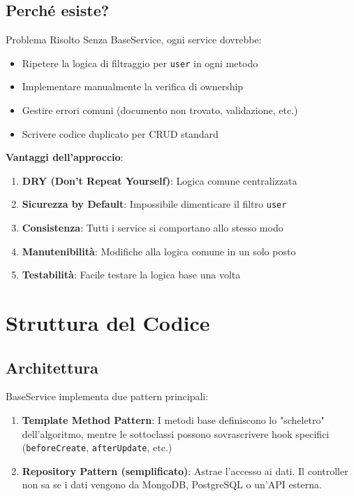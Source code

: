 \documentclass[11pt,a4paper]{article}
\begin{document}
\subsection{Perché esiste?}

\begin{importantbox}{Problema Risolto}
Senza BaseService, ogni service dovrebbe:
\begin{itemize}
    \item Ripetere la logica di filtraggio per \texttt{user} in ogni metodo
    \item Implementare manualmente la verifica di ownership
    \item Gestire errori comuni (documento non trovato, validazione, etc.)
    \item Scrivere codice duplicato per CRUD standard
\end{itemize}
\end{importantbox}

\textbf{Vantaggi dell'approccio}:
\begin{enumerate}
    \item \textbf{DRY (Don't Repeat Yourself)}: Logica comune centralizzata
    \item \textbf{Sicurezza by Default}: Impossibile dimenticare il filtro \texttt{user}
    \item \textbf{Consistenza}: Tutti i service si comportano allo stesso modo
    \item \textbf{Manutenibilità}: Modifiche alla logica comune in un solo posto
    \item \textbf{Testabilità}: Facile testare la logica base una volta
\end{enumerate}

\section{Struttura del Codice}

\subsection{Architettura}

BaseService implementa due pattern principali:

\begin{enumerate}
    \item \textbf{Template Method Pattern}: I metodi base definiscono lo "scheletro" dell'algoritmo, mentre le sottoclassi possono sovrascrivere hook specifici (\texttt{beforeCreate}, \texttt{afterUpdate}, etc.)
    \item \textbf{Repository Pattern (semplificato)}: Astrae l'accesso ai dati. Il controller non sa se i dati vengono da MongoDB, PostgreSQL o un'API esterna.
\end{enumerate}
\end{document}

